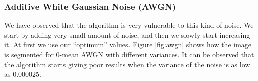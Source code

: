 \subsubsection{Additive White Gaussian Noise (AWGN) }

We have observed that the algorithm is very vulnerable to this kind of noise. We start by adding very small amount of noise, and then we slowly start increasing it. At first we use our ``optimum'' values. Figure \ref{fig:awgn} shows how the image is segmented for 0-mean AWGN with different variances. It can be observed that the algorithm starts giving poor results when the variance of the noise is as low as 0.000025.

\begin{figure}[!hbt]
\centering   
{}


\end{figure}
